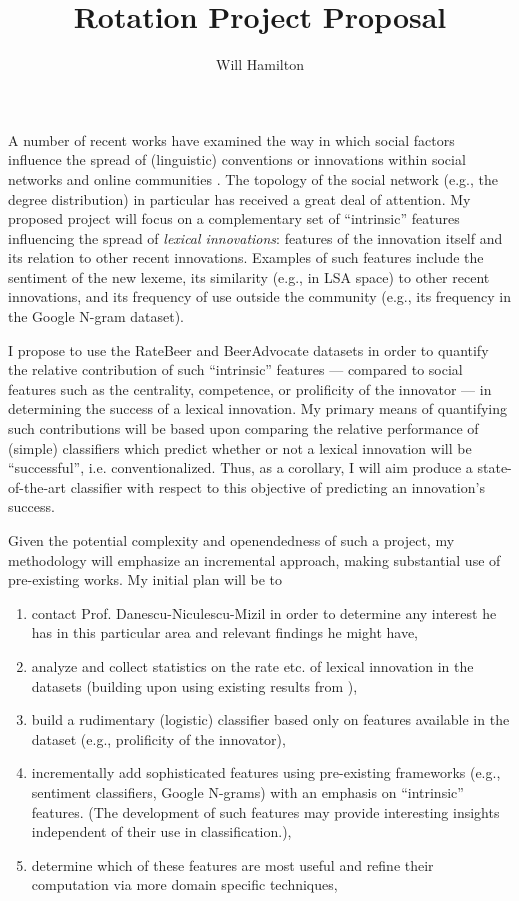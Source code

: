 \documentclass[12pt,a4paper]{article}
\author{Will Hamilton}
\title{Rotation Project Proposal}
\begin{document}
\maketitle

A number of recent works have examined the way in which social factors influence the spread of (linguistic) conventions or innovations within social networks and online communities \citep[e.g.,][]{centola_spontaneous_2015, danescu-niculescu-mizil_no_2013,kooti_predicting_2012, montanari_spread_2010, young_dynamics_2011}.
The topology of the social network (e.g., the degree distribution) in particular has received a great deal of attention.
My proposed project will focus on a complementary set of ``intrinsic'' features influencing the spread of \emph{lexical innovations}: features of the innovation itself and its relation to other recent innovations.
Examples of such features include the sentiment of the new lexeme, its similarity (e.g., in LSA space) to other recent innovations, and its frequency of use outside the community (e.g., its frequency in the Google N-gram dataset). 

I propose to use the RateBeer and BeerAdvocate  datasets in order to quantify the relative contribution of such ``intrinsic'' features --- compared to social features such as the centrality, competence, or prolificity of the innovator --- in determining the success of a lexical innovation.
My primary means of quantifying such contributions will be based upon comparing the relative performance of (simple) classifiers which predict whether or not a lexical innovation will be ``successful'', i.e. conventionalized.
Thus, as a corollary, I will aim produce a state-of-the-art classifier with respect to this objective of predicting an innovation's success. 

Given the potential complexity and openendedness of such a project, my methodology will emphasize an incremental approach, making substantial use of pre-existing works.
My initial plan will be to
\begin{enumerate}
\item
contact Prof. Danescu-Niculescu-Mizil in order to determine any interest he has in this particular area and relevant findings he might have,
\item
analyze and collect statistics on the rate etc. of lexical innovation in the datasets (building upon using existing results from \citep{danescu-niculescu-mizil_no_2013}),
\item
build a rudimentary (logistic) classifier based only on features available in the dataset (e.g., prolificity of the innovator),
\item
incrementally add sophisticated features using pre-existing frameworks  (e.g., sentiment classifiers, Google N-grams) with an emphasis on ``intrinsic'' features.  (The development of such features may provide interesting insights independent of their use in classification.),
\item
determine which of these features are most useful and refine their computation via more domain specific techniques,
\end{enumerate}

{\small


}

 
\end{document}
